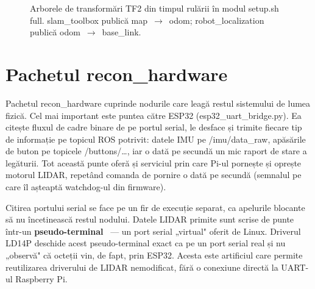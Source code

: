 \documentclass[a4paper,12pt,twoside,openany]{report}
\renewcommand{\texttt}[1]{\textnormal{#1}}
\begin{document}
\begin{figure}[H]
\centering
{}
\caption{Arborele de transformări TF2 din timpul rulării în modul \texttt{setup.sh full}. \texttt{slam\_toolbox} publică \texttt{map}~$\to$~\texttt{odom}; \texttt{robot\_localization} publică \texttt{odom}~$\to$~\texttt{base\_link}.}
\label{fig:tf-tree}
\end{figure}

\section{Pachetul recon\_hardware}
\label{sec:recon-hardware}

Pachetul \texttt{recon\_hardware} cuprinde nodurile care leagă restul
sistemului de lumea fizică. Cel mai important este puntea către ESP32
(\texttt{esp32\_uart\_bridge.py}). Ea citește fluxul de cadre binare de pe
portul serial, le desface și trimite fiecare tip de informație pe topicul ROS
potrivit: datele IMU pe \texttt{/imu/data\_raw}, apăsările de buton pe
topicele \texttt{/buttons/\ldots}, iar o dată pe secundă un mic raport de stare
a legăturii. Tot această punte oferă și serviciul prin care Pi-ul pornește și
oprește motorul LIDAR, repetând comanda de pornire o dată pe secundă (semnalul
pe care îl așteaptă watchdog-ul din firmware).

Citirea portului serial se face pe un fir de execuție separat, ca apelurile
blocante să nu încetinească restul nodului. Datele LIDAR primite sunt scrise
de punte într-un \textbf{pseudo-terminal}~\cite{linuxpty} --- un port serial
„virtual" oferit de Linux. Driverul LD14P deschide acest pseudo-terminal exact
ca pe un port serial real și nu „observă" că octeții vin, de fapt, prin ESP32.
Acesta este artificiul care permite reutilizarea driverului de LIDAR nemodificat,
fără o conexiune directă la UART-ul Raspberry Pi.
\end{document}
